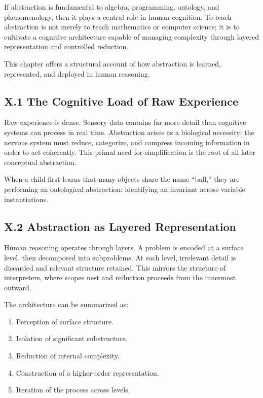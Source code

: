 \documentclass[12pt,letterpaper]{article}
\begin{document}
If abstraction is fundamental to algebra, programming, ontology, and phenomenology, then it plays a central role in human cognition. To teach abstraction is not merely to teach mathematics or computer science; it is to cultivate a cognitive architecture capable of managing complexity through layered representation and controlled reduction.

This chapter offers a structural account of how abstraction is learned, represented, and deployed in human reasoning.

\subsection{X.1 The Cognitive Load of Raw Experience}

Raw experience is dense. Sensory data contains far more detail than cognitive systems can process in real time. Abstraction arises as a biological necessity: the nervous system must reduce, categorize, and compress incoming information in order to act coherently. This primal need for simplification is the root of all later conceptual abstraction.

When a child first learns that many objects share the name ``ball,'' they are performing an ontological abstraction: identifying an invariant across variable instantiations.

\subsection{X.2 Abstraction as Layered Representation}

Human reasoning operates through layers. A problem is encoded at a surface level, then decomposed into subproblems. At each level, irrelevant detail is discarded and relevant structure retained. This mirrors the structure of interpreters, where scopes nest and reduction proceeds from the innermost outward.

The architecture can be summarized as:

\begin{enumerate}
    \item Perception of surface structure.
    \item Isolation of significant substructure.
    \item Reduction of internal complexity.
    \item Construction of a higher-order representation.
    \item Iteration of the process across levels.
\end{enumerate}
\end{document}
